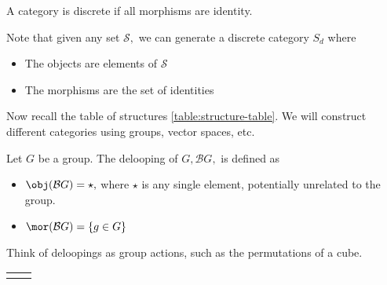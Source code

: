 \begin{definition}
    A category is discrete if all morphisms are identity.
\end{definition}

Note that given any set $\mathcal{S},$ we can generate a discrete category $S_d$ where 
\begin{itemize}
    \item The objects are elements of $\mathcal{S}$
    \item The morphisms are the set of identities
\end{itemize}

Now recall the table of structures \ref{table:structure-table}. We will construct different categories using groups, vector spaces, etc. 

\begin{definition} [Deloopings]
    Let $G$ be a group. The delooping of $G, \mathcal{B}G,$ is defined as 
    \begin{itemize}
        \item $\obj (\mathcal{B}G) = \star,$ where $\star$ is any single element, potentially unrelated to the group. 
        \item $\mor (\mathcal{B}G) = \{ g \in G\}$
    \end{itemize}
\end{definition}

\begin{example}  
Think of deloopings as group actions, such as the permutations of a cube. 
\begin{center}
\begin{tabular}{cc}
\begin{tikzcd}
	\star
	\arrow["fg", shift left=2, from=1-1, to=1-1, loop, in=55, out=125, distance=10mm]
	\arrow["g", shift left=2, from=1-1, to=1-1, loop, in=145, out=215, distance=10mm]
	\arrow["f", shift left=2, from=1-1, to=1-1, loop, in=325, out=35, distance=10mm]
	\arrow["e", shift left=2, from=1-1, to=1-1, loop, in=235, out=305, distance=10mm]
\end{tikzcd} &
\begin{tikzcd}
	\square
	\arrow["0", shift left=2, from=1-1, to=1-1, loop, in=55, out=125, distance=10mm]
	\arrow["1", shift left=2, from=1-1, to=1-1, loop, in=325, out=35, distance=10mm]
	\arrow["2", shift left=2, from=1-1, to=1-1, loop, in=320, out=40, distance=20mm]
	\arrow["3", shift left=2, from=1-1, to=1-1, loop, in=320, out=40, distance=30mm]
\end{tikzcd}
\end{tabular}    
\end{center}
\end{example}

